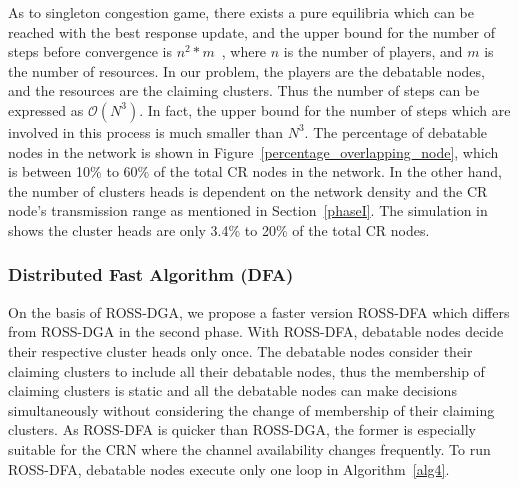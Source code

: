 \documentclass[times]{ettauth}
\theoremstyle{mytheoremstyle}
\theoremstyle{mytheoremstyle}
\theoremstyle{mytheoremstyle}
\begin{document}
As to singleton congestion game, there exists a pure equilibria which can be reached with the best response update, and the upper bound for the number of steps before convergence is $n^2*m$~\cite{Ackermann06purenash}, where $n$ is the number of players, and $m$ is the number of resources.
In our problem, the players are the debatable nodes, and the resources are the claiming clusters.
Thus the number of steps can be expressed as $\mathcal{O}(N^3)$.
%
In fact, the upper bound for the number of steps which are involved in this process is much smaller than $N^3$.
The percentage of debatable nodes in the network is shown in Figure~\ref{percentage_overlapping_node}, which is between 10\% to 60\% of the total CR nodes in the network.
In the other hand, the number of clusters heads is dependent on the network density and the CR node's transmission range as mentioned in Section~\ref{phaseI}.
The simulation in \cite{robust_clustering_arxiv} shows the cluster heads are only 3.4\% to 20\% of the total CR nodes.




\subsubsection{Distributed Fast Algorithm (DFA)}
On the basis of ROSS-DGA, we propose a faster version ROSS-DFA which differs from ROSS-DGA in the second phase.
With ROSS-DFA, debatable nodes decide their respective cluster heads only once.
The debatable nodes consider their claiming clusters to include all their debatable nodes, thus the membership of claiming clusters is static and all the debatable nodes can make decisions simultaneously without considering the change of membership of their claiming clusters.
As ROSS-DFA is quicker than ROSS-DGA, the former is especially suitable for the CRN where the channel availability changes frequently.
To run ROSS-DFA, debatable nodes execute only one loop in Algorithm~\ref{alg4}.
\end{document}
